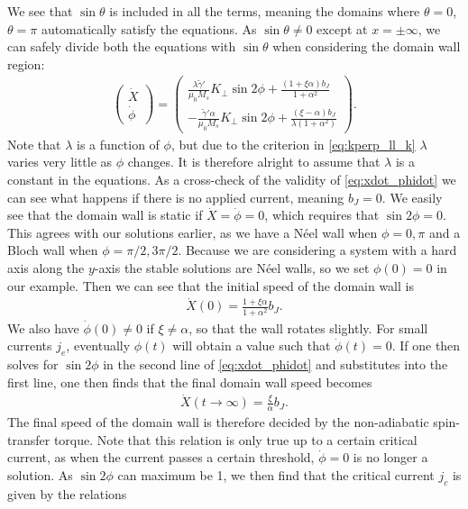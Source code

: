 \documentclass[12pt, a4paper, twoside, openright]{article}		%
\numberwithin{equation}{section}
\begin{document}
We see that $\sin\theta$ is included in all the terms, meaning the domains where $\theta = 0$, $\theta = \pi$ automatically satisfy the equations. As $\sin\theta \neq 0$ except at $x = \pm \infty$, we can safely divide both the equations with $\sin\theta$ when considering the domain wall region:
\begin{align}
\label{eq:xdot_phidot}
\begin{pmatrix}
\dot{X} \\ \dot{\phi}
\end{pmatrix}
=
\begin{pmatrix}
\frac{\lambda \tilde{\gamma}'}{\mu_0 M_s} K_{\perp} \sin2\phi + \frac{(1+\xi\alpha)b_J}{1+\alpha^2} \\
-\frac{\tilde{\gamma}'\alpha}{\mu_0 M_s} K_{\perp} \sin2\phi + \frac{(\xi-\alpha)b_J}{\lambda(1+\alpha^2)}
\end{pmatrix}.
\end{align}
Note that $\lambda$ is a function of $\phi$, but due to the criterion in \eqref{eq:kperp_ll_k} $\lambda$ varies very little as $\phi$ changes. It is therefore alright to assume that $\lambda$ is a constant in the equations. As a cross-check of the validity of \eqref{eq:xdot_phidot} we can see what happens if there is no applied current, meaning $b_J = 0$. We easily see that the domain wall is static if $\dot{X} = \dot{\phi} = 0$, which requires that $\sin2\phi = 0$. This agrees with our solutions earlier, as we have a N\'{e}el wall when $\phi = 0, \pi$ and a Bloch wall when $\phi = \pi/2, 3\pi/2$. Because we are considering a system with a hard axis along the $y$-axis the stable solutions are N\'{e}el walls, so we set $\phi(0) = 0$ in our example. Then we can see that the initial speed of the domain wall is
\begin{align}
\label{eq:Xdot0}
\dot{X}(0) = \frac{1+\xi\alpha}{1+\alpha^2}b_J.
\end{align}
We also have $\dot{\phi}(0) \neq 0$ if $\xi \neq \alpha$, so that the wall rotates slightly. For small currents $j_e$, eventually $\phi(t)$ will obtain a value such that $\dot{\phi}(t) = 0$. If one then solves for $\sin2\phi$ in the second line of \eqref{eq:xdot_phidot} and substitutes into the first line, one then finds that the final domain wall speed becomes
\begin{align}
\label{eq:xdot_undercrit}
\dot{X}(t\rightarrow\infty) = \frac{\xi}{\alpha} b_J.
\end{align}
The final speed of the domain wall is therefore decided by the non-adiabatic spin-transfer torque. Note that this relation is only true up to a certain critical current, as when the current passes a certain threshold, $\dot{\phi} = 0$ is no longer a solution. As $\sin2\phi$ can maximum be 1, we then find that the critical current $j_c$ is given by the relations
\end{document}
